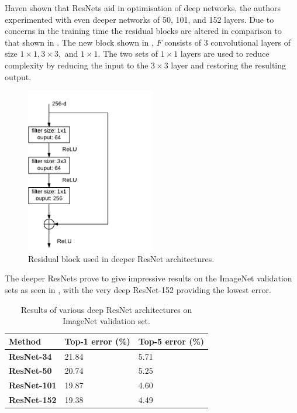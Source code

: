 Haven shown that ResNets aid in optimisation of deep networks, the authors experimented with even deeper networks of 50, 101, and 152 layers. Due to concerns in the training time the residual blocks are altered in comparison to that shown in . The new block shown in , $F$ consists of 3 convolutional layers of size $1 \times 1, 3 \times 3,$ and $1 \times 1$. The two sets of $1 \times 1$ layers are used to reduce complexity by reducing the input to the $3 \times 3$ layer and restoring the resulting output. 

\begin{figure}[H]
  \centering
    \includegraphics[width=0.5\textwidth]{Figs/Techanal/newresblock.pdf}
    \caption{Residual block used in deeper ResNet architectures.}
    \label{fig:newresblock}
\end{figure}


The deeper ResNets prove to give impressive results on the ImageNet validation sets as seen in , with the very deep ResNet-152 providing the lowest error.

\begin{table}[]
\centering
\caption{Results of various deep ResNet architectures on ImageNet validation set.}
\label{tab:deepresimagenet}
\begin{tabular}{|l|l|l|}
\hline
\textbf{Method}     & \textbf{Top-1 error (\%)} & \textbf{Top-5 error (\%)} \\ \hline
\textbf{ResNet-34}  & 21.84            & 5.71             \\ \hline
\textbf{ResNet-50}  & 20.74            & 5.25             \\ \hline
\textbf{ResNet-101} & 19.87            & 4.60             \\ \hline
\textbf{ResNet-152} & 19.38            & 4.49             \\ \hline
\end{tabular}
\end{table}

